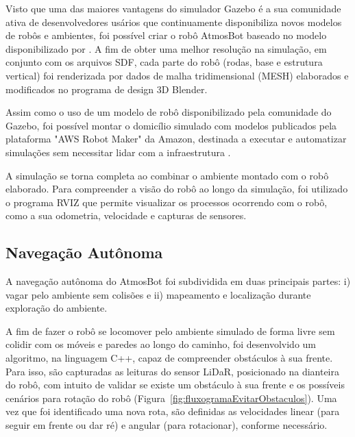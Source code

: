 Visto que uma das maiores vantagens do simulador Gazebo é a sua comunidade ativa de desenvolvedores usários que continuamente disponibiliza novos modelos de robôs e ambientes, foi possível criar o robô AtmosBot baseado no modelo disponibilizado por \citet{modeloRobo}. A fim de obter uma melhor resolução na simulação, em conjunto com os arquivos SDF, cada parte do robô (rodas, base e estrutura vertical) foi renderizada por dados de malha tridimensional (MESH) elaborados e modificados no programa de design 3D Blender.

Assim como o uso de um modelo de robô disponibilizado pela comunidade do Gazebo, foi possível montar o domicílio simulado com modelos publicados pela plataforma "AWS Robot Maker" da Amazon, destinada a executar e automatizar simulações sem necessitar lidar com a infraestrutura \cite{aws, modeloAmbiente}.

A simulação se torna completa ao combinar o ambiente montado com o robô elaborado. Para compreender a visão do robô ao longo da simulação, foi utilizado o programa RVIZ que permite visualizar os processos ocorrendo com o robô, como a sua odometria, velocidade e capturas de sensores.

\subsection{Navegação Autônoma}

A navegação autônoma do AtmosBot foi subdividida em duas principais partes: i) vagar pelo ambiente sem colisões e ii) mapeamento e localização durante exploração do ambiente.

A fim de fazer o robô se locomover pelo ambiente simulado de forma livre sem colidir com os móveis e paredes ao longo do caminho, foi desenvolvido um algoritmo, na linguagem C++, capaz de compreender obstáculos à sua frente. Para isso, são capturadas as leituras do sensor LiDaR, posicionado na dianteira do robô, com intuito de validar se existe um obstáculo à sua frente e os possíveis cenários para rotação do robô (Figura~\ref{fig:fluxogramaEvitarObstaculos}).  Uma vez que foi identificado uma nova rota, são definidas as velocidades linear (para seguir em frente ou dar ré) e angular (para rotacionar), conforme necessário.

